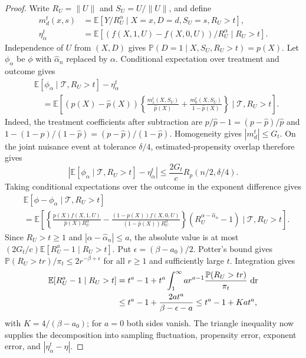 \documentclass[12pt]{article}
\theoremstyle{plain}
\theoremstyle{definition}
\begin{document}
\begin{proof}

Write $R_U=\|U\|$ and $S_U=U/\|U\|$, and define 
\[
\begin{aligned} m_d^t(x,s)&=\mathbb E[Y/R_U^\alpha\mid X=x,D=d,S_U=s,R_U>t],\\ \eta_\alpha^t&=\mathbb E[(f(X,1,U)-f(X,0,U))/R_U^\alpha\mid R_U>t].\end{aligned}
\]
 Independence of $U$ from $(X,D)$ gives $\mathbb P(D=1\mid X,S_U,R_U>t)=p(X)$. Let $\phi_\alpha$ be $\phi$ with $\hat\alpha_n$ replaced by $\alpha$. Conditional expectation over treatment and outcome gives 
\[
\begin{aligned} &\mathbb E[\phi_\alpha\mid\mathcal T,R_U>t]-\eta_\alpha^t\\ &\quad=\mathbb E\left[(p(X)-\hat p(X))\left\{\frac{m_1^t(X,S_U)}{\hat p(X)}+\frac{m_0^t(X,S_U)}{1-\hat p(X)}\right\}\mid\mathcal T,R_U>t\right].\end{aligned}
\]
 Indeed, the treatment coefficients after subtraction are $p/\hat p-1=(p-\hat p)/\hat p$ and $1-(1-p)/(1-\hat p)=(p-\hat p)/(1-\hat p)$. Homogeneity gives $|m_d^t|\leq G_t$. On the joint nuisance event at tolerance $\delta/4$, estimated-propensity overlap therefore gives 
\[
|\mathbb E[\phi_\alpha\mid\mathcal T,R_U>t]-\eta_\alpha^t|\leq\frac{2G_t}{c}R_p(n/2,\delta/4).
\]
 Taking conditional expectations over the outcome in the exponent difference gives 
\[
\begin{aligned} &\mathbb E[\phi-\phi_\alpha\mid\mathcal T,R_U>t]\\ &=\mathbb E\left[\left\{\frac{p(X)f(X,1,U)}{\hat p(X)R_U^\alpha}-\frac{(1-p(X))f(X,0,U)}{(1-\hat p(X))R_U^\alpha}\right\}(R_U^{\alpha-\hat\alpha_n}-1)\mid\mathcal T,R_U>t\right].\end{aligned}
\]
 Since $R_U>t\geq1$ and $|\alpha-\hat\alpha_n|\leq a$, the absolute value is at most $(2G_t/c)\mathbb E[R_U^a-1\mid R_U>t]$. Put $\epsilon=(\beta-a_0)/2$. Potter's bound gives $\mathbb P(R_U>tr)/\pi_t\leq2r^{-\beta+\epsilon}$ for all $r\geq1$ and sufficiently large $t$. Integration gives 
\[
\begin{aligned} \mathbb E[R_U^a-1\mid R_U>t]&=t^a-1+t^a\int_1^\infty a r^{a-1}\frac{\mathbb P(R_U>tr)}{\pi_t}\,\operatorname{dr}\\ &\leq t^a-1+\frac{2a t^a}{\beta-\epsilon-a}\leq t^a-1+K a t^a,\end{aligned}
\]
 with $K=4/(\beta-a_0)$; for $a=0$ both sides vanish. The triangle inequality now supplies the decomposition into sampling fluctuation, propensity error, exponent error, and $|\eta_\alpha^t-\eta|$. 


\end{proof}
\end{document}

